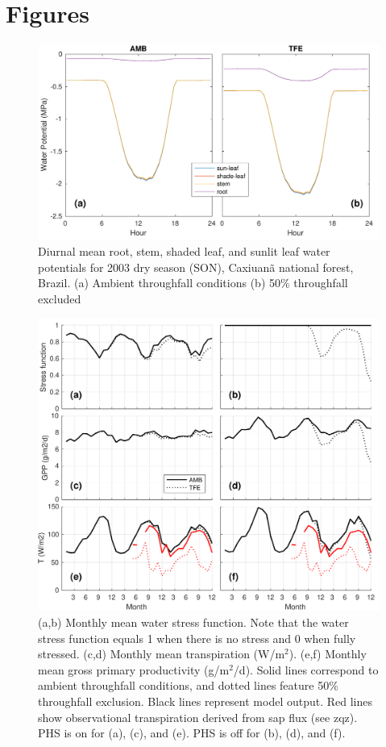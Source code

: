\documentclass[draft,linenumbers]{agujournal}
\begin{document}
    
\clearpage    

\section{Figures}
  \begin{figure}[h]
     \centering
     \includegraphics[width=30pc]{../figs/fig2.pdf}
     \caption{Diurnal mean root, stem, shaded leaf, and sunlit leaf water potentials for 2003 dry season (SON), Caxiuan\~a national forest, Brazil.
     (a) Ambient throughfall conditions (b) 50\% throughfall excluded
     }
     \label{fig2}
  \end{figure}
  
  \clearpage   
  \begin{figure}[h]
     \centering
     \includegraphics[width=30pc]{../figs/fig3.pdf}
     \caption{(a,b) Monthly mean water stress function. Note that the water stress function equals 1 when there is no stress and 0 when fully stressed.
     (c,d) Monthly mean transpiration (W/m$^2$).
     (e,f) Monthly mean gross primary productivity (g/m$^2$/d). 
     Solid lines correspond to ambient throughfall conditions, and dotted lines feature 50\% throughfall exclusion.
     Black lines represent model output.
     Red lines show observational transpiration derived from sap flux (see zqz).
     PHS is on for (a), (c), and (e). PHS is off for (b), (d), and (f).
     }
     \label{fig3}
  \end{figure}
  
\end{document}
